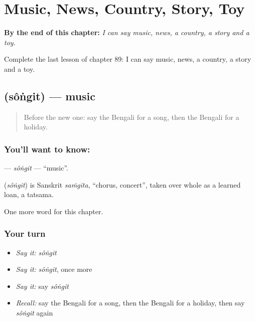 
\chapter{Music, News, Country, Story, Toy}
\label{ch:bn-music-news-country-story-toy}

\begin{chapteropening}
\textbf{By the end of this chapter:} \emph{I can say music, news, a country, a story and a toy.}

Complete the last lesson of chapter 89: I can say music, news, a country, a story and a toy.
\end{chapteropening}

\section[\texorpdfstring{\bn{সংগীত} (sôṅgit)}{সংগীত (sôṅgit)}]{ (sôṅgit) — music}

\label{lesson:BN-C89-songit}



\begin{quote}
Before the new one: say the Bengali for a song, then the Bengali for a holiday.
\end{quote}

\subsection*{You'll want to know: }
\textbf{} — \emph{sôṅgit} — \textquotedblleft{}music\textquotedblright{}.

\begin{cousinweb}
\textbf{} (\emph{sôṅgit}) is Sanskrit \emph{saṁgīta}, \textquotedblleft{}chorus, concert\textquotedblright{}, taken over whole as a learned loan, a tatsama.
\end{cousinweb}

\begin{grammarlens}[title={What you've built}]
One more word for this chapter.
\end{grammarlens}

\subsection*{Your turn}
\begin{itemize}
\raggedright
  \item \emph{Say it:} \emph{sôṅgit}
  \item \emph{Say it:} \emph{sôṅgit}, once more
  \item \emph{Say it:} say \emph{sôṅgit}
  \item \emph{Recall:} say the Bengali for a song, then the Bengali for a holiday, then say \emph{sôṅgit} again
\end{itemize}

